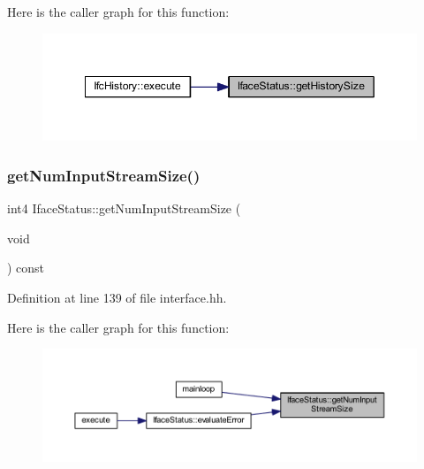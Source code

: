 Here is the caller graph for this function\+:
\nopagebreak
\begin{figure}[H]
\begin{center}
\leavevmode
\includegraphics[width=349pt]{class_iface_status_aaf46b06f2ddb74f7e59ab6c13c9ce3db_icgraph}
\end{center}
\end{figure}
\mbox{\label{class_iface_status_acbc5b718b829b1cee5e0d9873cd641de}} 
\subsubsection{\texorpdfstring{getNumInputStreamSize()}{getNumInputStreamSize()}}
{\footnotesize\ttfamily int4 Iface\+Status\+::get\+Num\+Input\+Stream\+Size (\begin{DoxyParamCaption}\item[{void}]{ }\end{DoxyParamCaption}) const\hspace{0.3cm}{\ttfamily [inline]}}



Definition at line 139 of file interface.\+hh.

Here is the caller graph for this function\+:
\nopagebreak
\begin{figure}[H]
\begin{center}
\leavevmode
\includegraphics[width=350pt]{class_iface_status_acbc5b718b829b1cee5e0d9873cd641de_icgraph}
\end{center}
\end{figure}
\mbox{\label{class_iface_status_a44e42915eec1a7c39b3153d0fe695b90}} 
